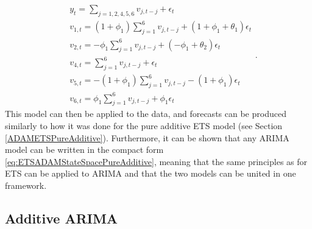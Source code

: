 \documentclass[]{book}
\theoremstyle{definition}
\theoremstyle{definition}
\theoremstyle{definition}
\theoremstyle{definition}
\theoremstyle{remark}
\begin{document}
\begin{equation*}
    \begin{aligned}
    &{y}_{t} = \sum_{j=1,2,4,5,6} v_{j,t-j} + \epsilon_t \\
    & v_{1,t} = (1+\phi_1) \sum_{j=1}^6 v_{j,t-j} + (1+\phi_1+\theta_1) \epsilon_t \\
    & v_{2,t} = -\phi_1 \sum_{j=1}^6 v_{j,t-j} + (-\phi_1+\theta_2) \epsilon_t \\
    & v_{4,t} = \sum_{j=1}^6 v_{j,t-j} + \epsilon_t \\
    & v_{5,t} = -(1+\phi_1) \sum_{j=1}^6 v_{j,t-j} -(1+\phi_1) \epsilon_t \\
    & v_{6,t} = \phi_1 \sum_{j=1}^6 v_{j,t-j} + \phi_1 \epsilon_t
    \end{aligned} .
\end{equation*}
This model can then be applied to the data, and forecasts can be produced similarly to how it was done for the pure additive ETS model (see Section \ref{ADAMETSPureAdditive}). Furthermore, it can be shown that any ARIMA model can be written in the compact form \eqref{eq:ETSADAMStateSpacePureAdditive}, meaning that the same principles as for ETS can be applied to ARIMA and that the two models can be united in one framework.

\hypertarget{StateSpaceARIMAAdditive}{%
\subsection{Additive ARIMA}\label{StateSpaceARIMAAdditive}}
\end{document}
